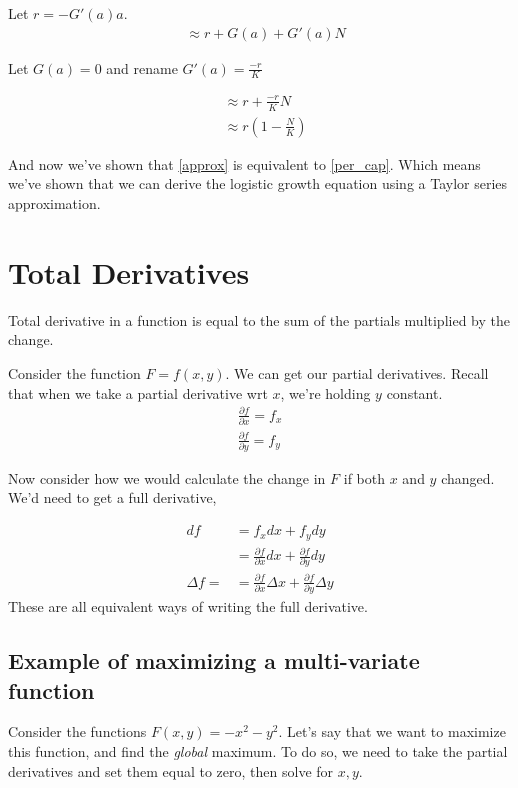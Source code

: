 \documentclass{article}
\begin{document}
Let $r =  - G'(a)a$.
\begin{align}
    & \approx r + G(a) + G'(a) N
\end{align}

Let $G(a) = 0$  and rename $G'(a) = \frac{-r}{K}$

\begin{align}
    &\approx r + \frac{-r}{K}N\\
    &\approx r(1 - \frac{N}{K}) \label{approx}
\end{align}

And now we've shown that \ref{approx} is equivalent to \ref{per_cap}. Which means we've shown that we can derive the logistic growth equation using a Taylor series approximation.



\section{Total Derivatives}
Total derivative in a function is equal to the sum of the partials multiplied by the change. 

Consider the function $ F = f(x,y)$. We can get our partial derivatives. Recall that when we take a partial derivative wrt $x$, we're holding $y$ constant.
\begin{align}
    \frac{\partial f}{\partial x} = f_x\\
    \frac{\partial f}{\partial y} = f_y
\end{align}

Now consider how we would calculate the change in $F$ if both $x$ and $y$ changed. We'd need to get a full derivative, 

\begin{align}
    df &= f_x dx + f_y dy \\
    &= \frac{\partial f}{\partial x} dx + \frac{\partial f}{\partial y} dy\\
    \Delta f = &= \frac{\partial f}{\partial x} \Delta x + \frac{\partial f}{\partial y} \Delta y
\end{align}
These are all equivalent ways of writing the full derivative. 

\subsection{Example of maximizing a multi-variate function}
Consider the functions $F(x,y) = -x^2 -y^2$. Let's say that we want to maximize this function, and find the \textit{global} maximum. To do so, we need to take the partial derivatives and set them equal to zero, then solve for $x,y$. 
\end{document}
